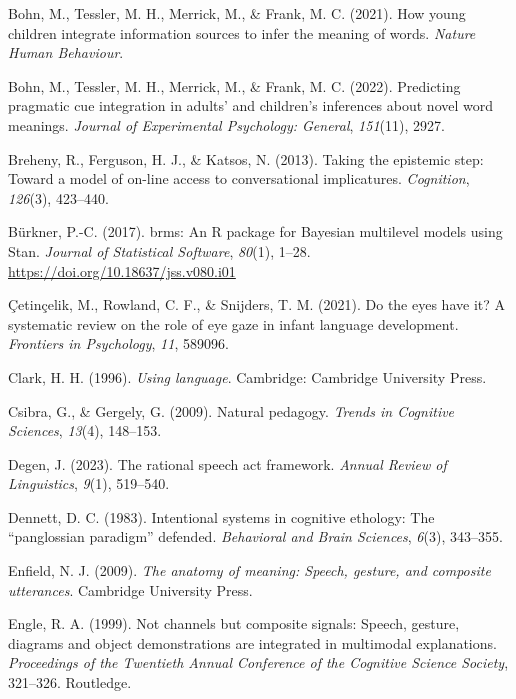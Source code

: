 \documentclass[
  man,floatsintext]{apa6}
\newlength{\cslhangindent}
\newenvironment{CSLReferences}[2] %
 {\begin{list}{}{%
  \setlength{\itemindent}{0pt}
  \setlength{\leftmargin}{0pt}
  \setlength{\parsep}{0pt}
  \ifodd #1
   \setlength{\leftmargin}{\cslhangindent}
   \setlength{\itemindent}{-1\cslhangindent}
  \fi
  \setlength{\itemsep}{#2\baselineskip}}}
 {\end{list}}
\begin{document}
\begin{CSLReferences}{1}{0}
Bohn, M., Tessler, M. H., Merrick, M., \& Frank, M. C. (2021). How young children integrate information sources to infer the meaning of words. \emph{Nature Human Behaviour}.

Bohn, M., Tessler, M. H., Merrick, M., \& Frank, M. C. (2022). Predicting pragmatic cue integration in adults' and children's inferences about novel word meanings. \emph{Journal of Experimental Psychology: General}, \emph{151}(11), 2927.

Breheny, R., Ferguson, H. J., \& Katsos, N. (2013). Taking the epistemic step: Toward a model of on-line access to conversational implicatures. \emph{Cognition}, \emph{126}(3), 423--440.

Bürkner, P.-C. (2017). {brms}: An {R} package for {Bayesian} multilevel models using {Stan}. \emph{Journal of Statistical Software}, \emph{80}(1), 1--28. \url{https://doi.org/10.18637/jss.v080.i01}

Çetinçelik, M., Rowland, C. F., \& Snijders, T. M. (2021). Do the eyes have it? A systematic review on the role of eye gaze in infant language development. \emph{Frontiers in Psychology}, \emph{11}, 589096.

Clark, H. H. (1996). \emph{Using language}. Cambridge: Cambridge University Press.

Csibra, G., \& Gergely, G. (2009). Natural pedagogy. \emph{Trends in Cognitive Sciences}, \emph{13}(4), 148--153.

Degen, J. (2023). The rational speech act framework. \emph{Annual Review of Linguistics}, \emph{9}(1), 519--540.

Dennett, D. C. (1983). Intentional systems in cognitive ethology: The {``panglossian paradigm''} defended. \emph{Behavioral and Brain Sciences}, \emph{6}(3), 343--355.

Enfield, N. J. (2009). \emph{The anatomy of meaning: Speech, gesture, and composite utterances}. Cambridge University Press.

Engle, R. A. (1999). Not channels but composite signals: Speech, gesture, diagrams and object demonstrations are integrated in multimodal explanations. \emph{Proceedings of the Twentieth Annual Conference of the Cognitive Science Society}, 321--326. Routledge.


\end{CSLReferences}
\end{document}
